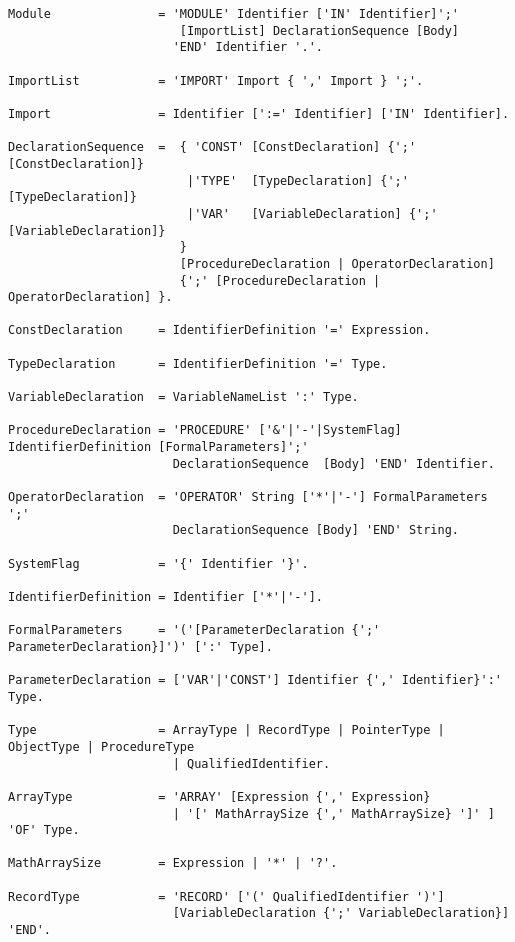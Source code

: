 \documentclass[a4paper,11pt]{article}
\begin{document}
\begin{lstlisting}[language = EBNF, frame=none,xleftmargin=0mm]
Module               = 'MODULE' Identifier ['IN' Identifier]';'
                        [ImportList] DeclarationSequence [Body]
                       'END' Identifier '.'.

ImportList           = 'IMPORT' Import { ',' Import } ';'.

Import               = Identifier [':=' Identifier] ['IN' Identifier].

DeclarationSequence  =  { 'CONST' [ConstDeclaration] {';' [ConstDeclaration]}
                         |'TYPE'  [TypeDeclaration] {';' [TypeDeclaration]}
                         |'VAR'   [VariableDeclaration] {';' [VariableDeclaration]}
                        }
                        [ProcedureDeclaration | OperatorDeclaration]
                        {';' [ProcedureDeclaration | OperatorDeclaration] }.

ConstDeclaration     = IdentifierDefinition '=' Expression.

TypeDeclaration      = IdentifierDefinition '=' Type.

VariableDeclaration  = VariableNameList ':' Type.

ProcedureDeclaration = 'PROCEDURE' ['&'|'-'|SystemFlag] IdentifierDefinition [FormalParameters]';'
                       DeclarationSequence  [Body] 'END' Identifier.

OperatorDeclaration  = 'OPERATOR' String ['*'|'-'] FormalParameters ';'
                       DeclarationSequence [Body] 'END' String.

SystemFlag           = '{' Identifier '}'.

IdentifierDefinition = Identifier ['*'|'-'].

FormalParameters     = '('[ParameterDeclaration {';' ParameterDeclaration}]')' [':' Type].

ParameterDeclaration = ['VAR'|'CONST'] Identifier {',' Identifier}':' Type.

Type                 = ArrayType | RecordType | PointerType | ObjectType | ProcedureType
                       | QualifiedIdentifier.

ArrayType            = 'ARRAY' [Expression {',' Expression}
                       | '[' MathArraySize {',' MathArraySize} ']' ] 'OF' Type.

MathArraySize        = Expression | '*' | '?'.

RecordType           = 'RECORD' ['(' QualifiedIdentifier ')']
                       [VariableDeclaration {';' VariableDeclaration}] 'END'.


\end{lstlisting}
\end{document}
